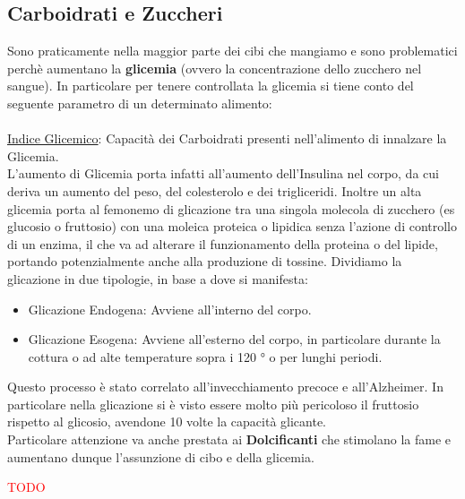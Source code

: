 \documentclass[../uefaC.tex]{subfiles}
\begin{document}
\subsection{Carboidrati e Zuccheri}
Sono praticamente nella maggior parte dei cibi che mangiamo e sono problematici perchè aumentano la \textbf{glicemia} (ovvero la concentrazione dello zucchero nel sangue). In particolare per tenere controllata la glicemia si tiene conto del seguente parametro di un determinato alimento: \hfill \\
\hfill \\
\underline{Indice Glicemico}: Capacità dei Carboidrati presenti nell'alimento di innalzare la Glicemia.
\hfill \\
L'aumento di Glicemia porta infatti all'aumento dell'Insulina nel corpo, da cui deriva un aumento del peso, del colesterolo e dei trigliceridi. Inoltre un alta glicemia porta al femonemo di glicazione tra una singola molecola di zucchero (es glucosio o fruttosio) con una moleica proteica o lipidica senza l'azione di controllo di un enzima, il che va ad alterare il funzionamento della proteina o del lipide, portando potenzialmente anche alla produzione di tossine. Dividiamo la glicazione in due tipologie, in base a dove si manifesta:
\begin{itemize}
    \item Glicazione Endogena: Avviene all'interno del corpo.
    \item Glicazione Esogena: Avviene all'esterno del corpo, in particolare durante la cottura o ad alte temperature sopra i 120 ° o per lunghi periodi.
\end{itemize}
Questo processo è stato correlato all'invecchiamento precoce e all'Alzheimer. In particolare nella glicazione si è visto essere molto più pericoloso il fruttosio rispetto al glicosio, avendone 10 volte la capacità glicante. \hfill \\
Particolare attenzione va anche prestata ai \textbf{Dolcificanti} che stimolano la fame e aumentano dunque l'assunzione di cibo e della glicemia.

\textcolor{red}{TODO}
\end{document}
